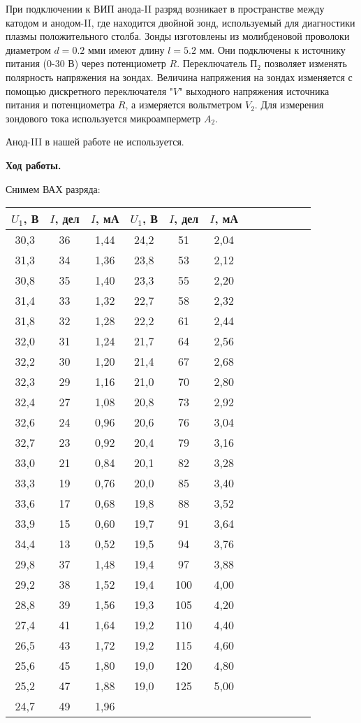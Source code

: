 \documentclass[14pt]{article}
\begin{document}
При подключении к ВИП анода-II разряд возникает в пространстве между катодом и анодом-II, где находится двойной зонд, используемый для диагностики плазмы положительного столба. Зонды изготовлены из молибденовой проволоки диаметром $d = 0.2$ мми имеют длину $l = 5.2$ мм. Они подключены к источнику питания (0-30 В) через потенциометр $R$. Переключатель П$_2$ позволяет изменять полярность напряжения на зондах. Величина напряжения на зондах изменяется с помощью дискретного переключателя "$V$" выходного напряжения источника питания и потенциометра $R$, а измеряется вольтметром $V_2$. Для измерения зондового тока используется микроамперметр $A_2$. 

Анод-III в нашей работе не используется. 

\newpage

\textbf{Ход работы.}

Снимем ВАХ разряда:

\begin{center}
\begin{tabular}{|c|c|c|c|c|c|c|c|c|c|c|c|}
\hline
$U_1$, В&$I$, дел&$I$, мА&$U_1$, В&$I$, дел&$I$, мА\\
\hline
30,3&36&1,44&24,2&51&2,04\\
\hline
31,3&34&1,36&23,8&53&2,12\\
\hline
30,8&35&1,40&23,3&55&2,20\\
\hline
31,4&33&1,32&22,7&58&2,32\\
\hline
31,8&32&1,28&22,2&61&2,44\\
\hline
32,0&31&1,24&21,7&64&2,56\\
\hline
32,2&30&1,20&21,4&67&2,68\\
\hline
32,3&29&1,16&21,0&70&2,80\\
\hline
32,4&27&1,08&20,8&73&2,92\\
\hline
32,6&24&0,96&20,6&76&3,04\\
\hline
32,7&23&0,92&20,4&79&3,16\\
\hline
33,0&21&0,84&20,1&82&3,28\\
\hline
33,3&19&0,76&20,0&85&3,40\\
\hline
33,6&17&0,68&19,8&88&3,52\\
\hline
33,9&15&0,60&19,7&91&3,64\\
\hline
34,4&13&0,52&19,5&94&3,76\\
\hline
29,8&37&1,48&19,4&97&3,88\\
\hline
29,2&38&1,52&19,4&100&4,00\\
\hline
28,8&39&1,56&19,3&105&4,20\\
\hline
27,4&41&1,64&19,2&110&4,40\\
\hline
26,5&43&1,72&19,2&115&4,60\\
\hline
25,6&45&1,80&19,0&120&4,80\\
\hline
25,2&47&1,88&19,0&125&5,00\\
\hline
24,7&49&1,96&&&\\
\hline
\end{tabular}
\end{center}
\end{document}
